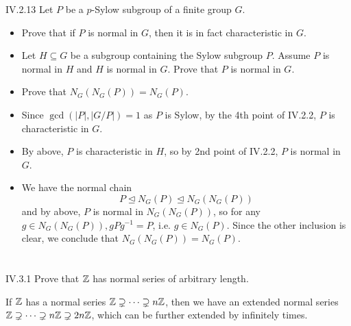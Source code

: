 \begin{problem}{IV.2.13}
Let $P$ be a $p$-Sylow subgroup of a finite group $G$.
\begin{itemize}
\setlength\itemsep{0pt}
\item Prove that if $P$ is normal in $G$, then it is in fact characteristic in $G$.
\item Let $H \subseteq G$ be a subgroup containing the Sylow subgroup $P$. Assume $P$ is normal in $H$ and $H$ is normal in $G$. Prove that $P$ is normal in $G$.
\item Prove that $N_G(N_G(P)) = N_G(P)$.
\end{itemize}
\end{problem}
\begin{pf}
\begin{itemize}
\setlength\itemsep{0pt}
\item Since $\gcd(|P|, |G/P|) = 1$ as $P$ is Sylow, by the 4th point of IV.2.2, $P$ is characteristic in $G$.
\item By above, $P$ is characteristic in $H$, so by 2nd point of IV.2.2, $P$ is normal in $G$.
\item We have the normal chain
\[
P \trianglelefteq N_G(P) \trianglelefteq N_G(N_G(P))	
\]
and by above, $P$ is normal in $N_G(N_G(P))$, so for any $g \in N_G(N_G(P)), gPg^{-1} = P$, i.e. $g \in N_G(P)$. Since the other inclusion is clear, we conclude that $N_G(N_G(P)) = N_G(P)$. 
\end{itemize}
\end{pf}

\section{}

\begin{problem}{IV.3.1}
Prove that $\mathbb{Z}$ has normal series of arbitrary length.
\end{problem}
\begin{pf}
If $\mathbb{Z}$ has a normal series $\mathbb{Z} \supsetneq \cdots \supsetneq n\mathbb{Z}$, then we have an extended normal series $\mathbb{Z} \supsetneq \cdots \supsetneq n\mathbb{Z} \supsetneq 2n\mathbb{Z}$, which can be further extended by infinitely times.
\end{pf}

